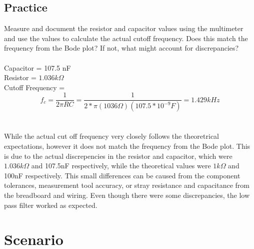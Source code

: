 \documentclass{article}
\begin{document}
\subsection{Practice}
Measure and document the resistor and capacitor values using the multimeter and use the values to calculate the actual cutoff frequency. Does this match the frequency from the Bode plot? If not, what might account for discrepancies?\\\\Capacitor = 107.5 nF\\
Resistor = $1.036 k\Omega$\\
Cutoff Frequency = \[f_c = \frac{1}{2\pi RC} = \frac{1}{2*\pi (1036\Omega)(107.5*10^{-9}F)} = 1.429kHz\] \\\\
While the actual cut off frequency very closely follows the theoretrical expectations, however it does not match the frequency from the Bode plot. This is due to the actual discrepencies in the resistor and capacitor, which were $1.036k\Omega$ and 107.5nF respectively, while the theoretical values were $1k\Omega$ and 100nF respectively. This small differences can be caused from the component tolerances, measurement tool accuracy, or stray resistance and capacitance from the breadboard and wiring. Even though there were some discrepancies, the low pass filter worked as expected. 

\newpage %
\appendix
\section{Scenario}


\end{document}

